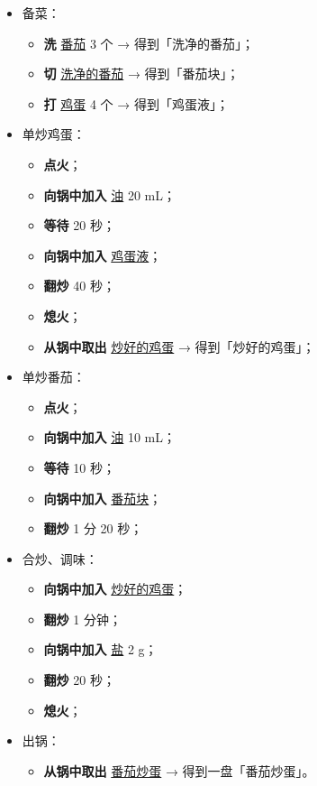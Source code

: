\begin{multicols}{2}
  \begin{itemize}
    \item 备菜：
      \begin{itemize}
        \item \textbf{洗} \underline{番茄} 3 个 → 得到「洗净的番茄」；
        \item \textbf{切} \underline{洗净的番茄} → 得到「番茄块」；
        \item \textbf{打} \underline{鸡蛋} 4 个 → 得到「鸡蛋液」；
      \end{itemize}
    \item 单炒鸡蛋：
      \begin{itemize}
        \item \textbf{点火}；
        \item \textbf{向锅中加入} \underline{油} 20 mL；
        \item \textbf{等待} 20 秒；
        \item \textbf{向锅中加入} \underline{鸡蛋液}；
        \item \textbf{翻炒} 40 秒；
        \item \textbf{熄火}；
        \item \textbf{从锅中取出} \underline{炒好的鸡蛋} → 得到「炒好的鸡蛋」；
      \end{itemize}
    \item 单炒番茄：
      \begin{itemize}
        \item \textbf{点火}；
        \item \textbf{向锅中加入} \underline{油} 10 mL；
        \item \textbf{等待} 10 秒；
        \item \textbf{向锅中加入} \underline{番茄块}；
        \item \textbf{翻炒} 1 分 20 秒；
      \end{itemize}
    \item 合炒、调味：
      \begin{itemize}
        \item \textbf{向锅中加入} \underline{炒好的鸡蛋}；
        \item \textbf{翻炒} 1 分钟；
        \item \textbf{向锅中加入} \underline{盐} 2 g；
        \item \textbf{翻炒} 20 秒；
        \item \textbf{熄火}；
      \end{itemize}
    \item 出锅：
      \begin{itemize}
        \item \textbf{从锅中取出} \underline{番茄炒蛋} → 得到一盘「番茄炒蛋」。
      \end{itemize}
  \end{itemize}
\end{multicols}

